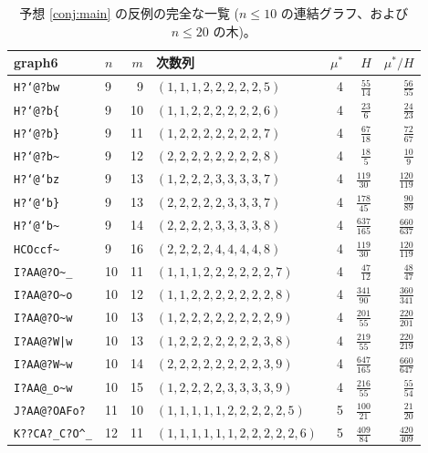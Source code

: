\documentclass[paper=a4,fontsize=10.5pt,jafontsize=10.5pt]{jlreq}
\theoremstyle{plain}
\theoremstyle{definition}
\begin{document}
\begin{table}[htbp]
\centering
\caption{予想 \ref{conj:main} の反例の完全な一覧
($n \le 10$ の連結グラフ、および $n \le 20$ の木)。}
\label{tab:ce}
\begin{tabular}{llrlrrr}
\toprule
graph6 & $n$ & $m$ & 次数列 & $\mu^*$ & $H$ & $\mu^*/H$ \\
\midrule
\texttt{H?`@?bw} & 9 & 9 & $(1,1,1,2,2,2,2,2,5)$ & 4 & $\frac{55}{14}$ & $\frac{56}{55}$ \\
\texttt{H?`@?b\{} & 9 & 10 & $(1,1,2,2,2,2,2,2,6)$ & 4 & $\frac{23}{6}$ & $\frac{24}{23}$ \\
\texttt{H?`@?b\}} & 9 & 11 & $(1,2,2,2,2,2,2,2,7)$ & 4 & $\frac{67}{18}$ & $\frac{72}{67}$ \\
\texttt{H?`@?b\textasciitilde{}} & 9 & 12 & $(2,2,2,2,2,2,2,2,8)$ & 4 & $\frac{18}{5}$ & $\frac{10}{9}$ \\
\texttt{H?`@`bz} & 9 & 13 & $(1,2,2,2,3,3,3,3,7)$ & 4 & $\frac{119}{30}$ & $\frac{120}{119}$ \\
\texttt{H?`@`b\}} & 9 & 13 & $(2,2,2,2,2,3,3,3,7)$ & 4 & $\frac{178}{45}$ & $\frac{90}{89}$ \\
\texttt{H?`@`b\textasciitilde{}} & 9 & 14 & $(2,2,2,2,3,3,3,3,8)$ & 4 & $\frac{637}{165}$ & $\frac{660}{637}$ \\
\texttt{HCOccf\textasciitilde{}} & 9 & 16 & $(2,2,2,2,4,4,4,4,8)$ & 4 & $\frac{119}{30}$ & $\frac{120}{119}$ \\
\texttt{I?AA@?O\textasciitilde{}\_} & 10 & 11 & $(1,1,1,2,2,2,2,2,2,7)$ & 4 & $\frac{47}{12}$ & $\frac{48}{47}$ \\
\texttt{I?AA@?O\textasciitilde{}o} & 10 & 12 & $(1,1,2,2,2,2,2,2,2,8)$ & 4 & $\frac{341}{90}$ & $\frac{360}{341}$ \\
\texttt{I?AA@?O\textasciitilde{}w} & 10 & 13 & $(1,2,2,2,2,2,2,2,2,9)$ & 4 & $\frac{201}{55}$ & $\frac{220}{201}$ \\
\texttt{I?AA@?W|w} & 10 & 13 & $(1,2,2,2,2,2,2,2,3,8)$ & 4 & $\frac{219}{55}$ & $\frac{220}{219}$ \\
\texttt{I?AA@?W\textasciitilde{}w} & 10 & 14 & $(2,2,2,2,2,2,2,2,3,9)$ & 4 & $\frac{647}{165}$ & $\frac{660}{647}$ \\
\texttt{I?AA@\_o\textasciitilde{}w} & 10 & 15 & $(1,2,2,2,2,3,3,3,3,9)$ & 4 & $\frac{216}{55}$ & $\frac{55}{54}$ \\
\texttt{J?AA@?OAFo?} & 11 & 10 & $(1,1,1,1,1,2,2,2,2,2,5)$ & 5 & $\frac{100}{21}$ & $\frac{21}{20}$ \\
\texttt{K??CA?\_C?O\textasciicircum{}\_} & 12 & 11 & $(1,1,1,1,1,1,2,2,2,2,2,6)$ & 5 & $\frac{409}{84}$ & $\frac{420}{409}$ \\

\end{tabular}
\end{table}
\end{document}
